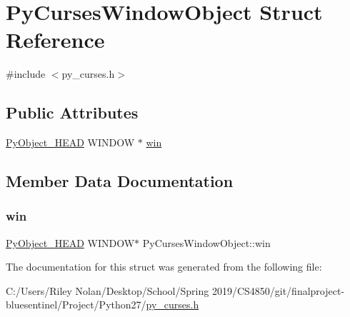 \hypertarget{struct_py_curses_window_object}{}\section{Py\+Curses\+Window\+Object Struct Reference}
\label{struct_py_curses_window_object}


{\ttfamily \#include $<$py\+\_\+curses.\+h$>$}

\subsection*{Public Attributes}
\begin{DoxyCompactItemize}
\item 
\mbox{\hyperlink{_python27_2object_8h_a0bf35c1f3ea13f925de94d8593db3b7e}{Py\+Object\+\_\+\+H\+E\+AD}} W\+I\+N\+D\+OW $\ast$ \mbox{\hyperlink{struct_py_curses_window_object_ad963a38c3738dce76f378c668a3254ba}{win}}
\end{DoxyCompactItemize}


\subsection{Member Data Documentation}
\mbox{\label{struct_py_curses_window_object_ad963a38c3738dce76f378c668a3254ba}} 
\subsubsection{\texorpdfstring{win}{win}}
{\footnotesize\ttfamily \mbox{\hyperlink{_python27_2object_8h_a0bf35c1f3ea13f925de94d8593db3b7e}{Py\+Object\+\_\+\+H\+E\+AD}} W\+I\+N\+D\+OW$\ast$ Py\+Curses\+Window\+Object\+::win}



The documentation for this struct was generated from the following file\+:\begin{DoxyCompactItemize}
\item 
C\+:/\+Users/\+Riley Nolan/\+Desktop/\+School/\+Spring 2019/\+C\+S4850/git/finalproject-\/bluesentinel/\+Project/\+Python27/\mbox{\hyperlink{py__curses_8h}{py\+\_\+curses.\+h}}\end{DoxyCompactItemize}
